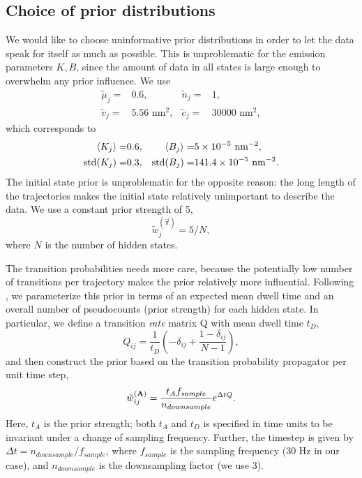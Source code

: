 \subsection{Choice of prior distributions}
We would like to choose uninformative prior distributions in order to
let the data speak for itself as much as possible. This is
unproblematic for the emission parameters $K,B$, since the amount of
data in all states is large enough to overwhelm any prior
influence. We use
\begin{align}
  \tilde\mu_j=&0.6, &
  \tilde n_j=&1,\\
  \tilde v_j =&5.56\text{ nm$^2$},&
  \tilde c_j=&30000\text{ nm$^2$},
\end{align}
which corresponds to 
\begin{align}
  \left\langle K_j\right\rangle=&0.6,&
  \left\langle B_j\right\rangle=&5\times 10^{-5}\text{ nm$^{-2}$},\\
  \mathrm{std}(K_j)=&0.3,&
  \mathrm{std}(B_j)=&141.4\times 10^{-5}\text{ nm$^{-2}$}.
\end{align}
The initial state prior is unproblematic for the opposite reason: the
long length of the trajectories makes the initial state relatively
unimportant to describe the data. We use a constant prior strength of
5,
\begin{equation}
  \tilde w_j^{(\vec\pi)}=5/N,
\end{equation}
where $N$ is the number of hidden states.

The transition probabilities needs more care, because the potentially
low number of transitions per trajectory makes the prior relatively
more influential.  Following \citet{persson2013}, we parameterize this
prior in terms of an expected mean dwell time and an overall number of
pseudocounts (prior strength) for each hidden state.  In particular,
we define a transition \textit{rate} matrix Q with mean dwell time
$t_D$,
\begin{equation}
  Q_{ij}=\frac{1}{t_D}\left(-\delta_{ij}
  +\frac{1-\delta_{ij}}{N-1}\right),
\end{equation}
and then construct the prior based on the transition probability
propagator per unit time step,
\begin{equation}
  \tilde w_{ij}^{(\mathbf{A})}=\frac{t_Af_{sample}}{n_{downsample}}
  e^{\Delta tQ}.
\end{equation}
Here, $t_A$ is the prior strength; both $t_A$ and $t_D$ is specified
in time units to be invariant under a change of sampling
frequency. Further, the timestep is given by $\Delta
t=n_{downsample}/f_{sample}$, where $f_{sample}$ is the sampling
frequency (30 Hz in our case), and $n_{downsample}$ is the
downsampling factor (we use 3).

